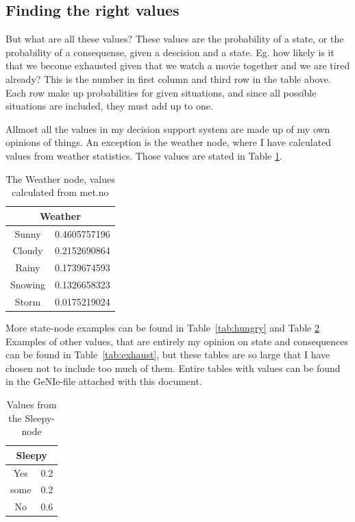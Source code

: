 \subsection{Finding the right values}
But what are all these values? These values are the probability of a
state, or the probability of a consequense, given a descision and a state. Eg.
how likely is it that we become exhausted given that we watch a movie together
and we are tired already? This is the number in first column and third row in
the table above. Each row make up probabilities for given situations, and since
all possible situations are included, they must add up to one.

Allmost all the values in my decision support system are made up of my own
opinions of things. An exception is the weather node, where I have calculated
values from weather statistics\cite{met}. Those values are stated in Table
\ref{tab:weather}.
\begin{table}[h!!!]
\begin{tabular}{|c|c|}
\hline
\multicolumn{2}{|c|}{Weather}\\
\hline
Sunny & 0.4605757196\\
Cloudy & 0.2152690864\\
Rainy & 0.1739674593\\
Snowing & 0.1326658323\\
Storm & 0.0175219024\\
\hline
\end{tabular}
\caption{The Weather node, values calculated from met.no\cite{met}}
\label{tab:weather}
\end{table}
More state-node examples can be found in Table~\ref{tab:hungry} and Table
\ref{tab:sleepy} Examples of other values, that are entirely my opinion on state
and consequences can be found in Table~\ref{tab:exhaust}, but these tables are
so large that I have chosen not to include too much of them. Entire tables with
values can be found in the GeNIe-file attached with this document.
\begin{table}
\begin{tabular}{|c|c|}
\hline
\multicolumn{2}{|c|}{Sleepy}\\
\hline
Yes & 0.2\\
some & 0.2\\
No & 0.6\\
\hline
\end{tabular}
\caption{Values from the Sleepy-node}
\label{tab:sleepy}
\end{table}

